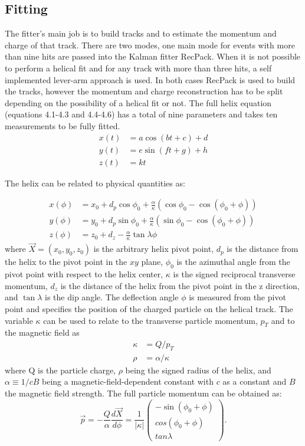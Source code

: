 \subsection{Fitting}
The fitter's main job is to build tracks and to estimate the momentum and charge of that track. There are two modes, one main mode for events with more than nine hits are passed into the Kalman fitter RecPack. When it is not possible to perform a helical fit and for any track with more than three hits, a self implemented lever-arm approach is used. In both cases RecPack is used to build the tracks, however the momentum and charge reconstruction has to be split depending on the possibility of a helical fit or not. The full helix equation (equations 4.1-4.3 and 4.4-4.6) has a total of nine parameters and takes ten measurements to be fully fitted.  
\begin{align}
x(t) &= a\cos(bt+c)+d\\
y(t) &= e\sin(ft+g) + h\\
z(t) &= kt
\end{align}

The helix can be related to physical quantities as:

\begin{align}
x(\phi) &= x_0 + d_p \cos \phi_0 + \frac{\alpha}{\kappa}(\cos \phi_0 - \cos(\phi_0 + \phi))\\ 
y(\phi) &= y_0 + d_p \sin \phi_0 + \frac{\alpha}{\kappa}(\sin \phi_0 - \cos(\phi_0 + \phi))\\
z(\phi) &= z_0 + d_z - \frac{\alpha}{\kappa} \tan \lambda \phi
\end{align}
where $\vec{X} = (x_0, y_0, z_0)$ is the arbitrary helix pivot point, $d_p$ is the distance from the helix to the pivot point in the $xy$ plane, $\phi_0$ is the azimuthal angle from the pivot point with respect to the helix center, $\kappa$ is the signed reciprocal transverse momentum, $d_z$ is the distance of the helix from the pivot point in the z direction, and $\tan\lambda$ is the dip angle. The deflection angle $\phi$ is measured from the pivot point and specifies the position of the charged particle on the helical track. The variable $\kappa$ can be used to relate to the transverse particle momentum, $p_T$ and to the magnetic field as 
\begin{align}
 \kappa &=  Q/p_T \\  
 \rho &=  \alpha/\kappa
 \end{align}
where Q is the particle charge, $\rho$ being the signed radius of the helix, and $\alpha \equiv 1/c B$ being a magnetic-field-dependent constant with $c$ as a constant and $B$ the magnetic field strength. The full particle momentum can be obtained as: 
\begin{equation}
\vec{p} = - \frac{Q}{\alpha} \frac{d\vec{X}}{d\phi} = \frac{1}{|\kappa |} 
 \begin{pmatrix}
 -\sin(\phi_0 + \phi)\\
 cos(\phi_0 + \phi)\\
 tan\lambda
 \end{pmatrix}.
\end{equation}


